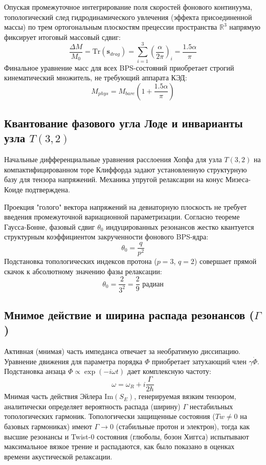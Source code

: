 \documentclass[12pt,a4paper]{article}
\begin{document}
	Опуская промежуточное интегрирование поля скоростей фонового континуума, топологический след гидродинамического увлечения (эффекта присоединенной массы) по трем ортогональным плоскостям прецессии пространства $\mathbb{R}^3$ напрямую фиксирует итоговый массовый сдвиг:
	\begin{equation}
		\frac{\Delta M}{M_0} = \text{Tr}\left(\mathbf{s}_{drag}\right) = \sum_{i=1}^3 \left( \frac{\alpha}{2\pi} \right)_i = \frac{1.5 \alpha}{\pi}
	\end{equation}
	Финальное уравнение масс для всех BPS-состояний приобретает строгий кинематический множитель, не требующий аппарата КЭД:
	\begin{equation}
		M_{phys} = M_{bare} \left( 1 + \frac{1.5 \alpha}{\pi} \right)
	\end{equation}
	
	\subsection{Квантование фазового угла Лоде и инварианты узла $T(3,2)$}
	
	Начальные дифференциальные уравнения расслоения Хопфа для узла $T(3,2)$ на компактифицированном торе Клиффорда задают установленную структурную базу для тензора напряжений. Механика упругой релаксации на конус Мизеса-Коиде подтверждена.
	
	Проекция "голого" вектора напряжений на девиаторную плоскость не требует введения промежуточной вариационной параметризации. Согласно теореме Гаусса-Бонне, фазовый сдвиг $\theta_0$ индуцированных резонансов жестко квантуется структурным коэффициентом закрученности фонового BPS-ядра:
	\begin{equation}
		\theta_0 = \frac{q}{p^2}
	\end{equation}
	Подстановка топологических индексов протона ($p=3$, $q=2$) совершает прямой скачок к абсолютному значению фазы релаксации:
	\begin{equation}
		\theta_0 = \frac{2}{3^2} = \frac{2}{9} \text{ радиан}
	\end{equation}
	
	\subsection{Мнимое действие и ширина распада резонансов ($\Gamma$)}
	Активная (мнимая) часть импеданса отвечает за необратимую диссипацию. Уравнение движения для параметра порядка $\Phi$ приобретает затухающий член $\gamma \dot{\Phi}$. Подстановка анзаца $\Phi \propto \exp(-i\omega t)$ дает комплексную частоту:
	\begin{equation}
		\omega = \omega_R + i \frac{\Gamma}{2\hbar}
	\end{equation}
	Мнимая часть действия Эйлера $\text{Im}(S_E)$, генерируемая вязким тензором, аналитически определяет вероятность распада (ширину) $\Gamma$ нестабильных топологических гармоник. Топологически защищенные состояния ($Tw \neq 0$ на базовых гармониках) имеют $\Gamma \to 0$ (стабильные протон и электрон), тогда как высшие резонансы и Twist-0 состояния (глюболы, бозон Хиггса) испытывают максимальное вязкое трение и распадаются, как было показано в оценках времени акустической релаксации.
\end{document}
